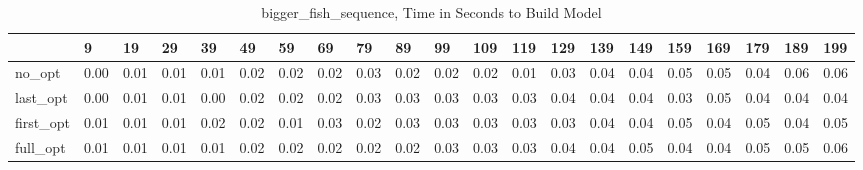 \begin{table}
\caption{bigger_fish_sequence, Time in Seconds to Build Model}
\label{bigger_fish_sequence_model_time}
\begin{tabular}{lllllllllllllllllllll}
\toprule
 & 9 & 19 & 29 & 39 & 49 & 59 & 69 & 79 & 89 & 99 & 109 & 119 & 129 & 139 & 149 & 159 & 169 & 179 & 189 & 199 \\
\midrule
no_opt & 0.00 & 0.01 & 0.01 & 0.01 & 0.02 & 0.02 & 0.02 & 0.03 & 0.02 & 0.02 & 0.02 & 0.01 & 0.03 & 0.04 & 0.04 & 0.05 & 0.05 & 0.04 & 0.06 & 0.06 \\
last_opt & 0.00 & 0.01 & 0.01 & 0.00 & 0.02 & 0.02 & 0.02 & 0.03 & 0.03 & 0.03 & 0.03 & 0.03 & 0.04 & 0.04 & 0.04 & 0.03 & 0.05 & 0.04 & 0.04 & 0.04 \\
first_opt & 0.01 & 0.01 & 0.01 & 0.02 & 0.02 & 0.01 & 0.03 & 0.02 & 0.03 & 0.03 & 0.03 & 0.03 & 0.03 & 0.04 & 0.04 & 0.05 & 0.04 & 0.05 & 0.04 & 0.05 \\
full_opt & 0.01 & 0.01 & 0.01 & 0.01 & 0.02 & 0.02 & 0.02 & 0.02 & 0.02 & 0.03 & 0.03 & 0.03 & 0.04 & 0.04 & 0.05 & 0.04 & 0.04 & 0.05 & 0.05 & 0.06 \\
\bottomrule
\end{tabular}
\end{table}
